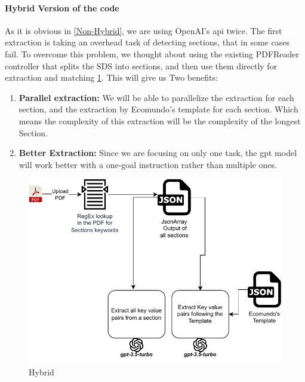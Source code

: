 \documentclass[a4paper,12pt,twoside]{report}
\begin{document}
\paragraph{Hybrid Version of the code}
As it is obvious in \ref{Non-Hybrid}, we are using OpenAI's api twice. The first extraction is taking an overhead task of detecting sections, that in some cases fail. To overcome this problem, we thought about using the existing PDFReader controller that splits the SDS into sections, and then use them directly for extraction and matching \ref{Hybrid}. This will give us Two benefits:
\begin{enumerate}
\item \textbf{Parallel extraction:} We will be able to parallelize the extraction for each section, and the extraction by Ecomundo's template for each section. Which means the complexity of this extraction will be the complexity of the longest Section. 
\item \textbf{Better Extraction:} Since we are focusing on only one task, the gpt model will work better with a one-goal instruction rather than multiple ones.
\end{enumerate}
\begin{figure}[H]
		\includegraphics[width=\textwidth, keepaspectratio ]{images/hybrid}
	\caption[How the Hybrid code works]{Hybrid}
\label{Hybrid}
\end{figure}
\end{document}
